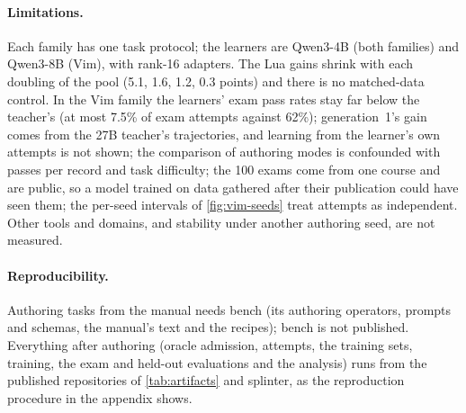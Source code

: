 \paragraph{Limitations.} Each family has one task protocol; the learners are Qwen3-4B (both families) and Qwen3-8B (Vim), with
rank-16 adapters. The Lua gains shrink with
each doubling of the pool (5.1, 1.6, 1.2, 0.3 points) and there is no matched-data control. In the Vim family the learners' exam
pass rates stay far below the teacher's (at most 7.5\% of exam attempts against 62\%); generation~1's gain comes from the 27B teacher's trajectories, and learning from the
learner's own attempts is not shown; the comparison of authoring modes is confounded with passes per record and task difficulty; the 100 exams come
from one course and are public, so a model trained on data gathered after their publication could have seen them; the per-seed intervals of \cref{fig:vim-seeds} treat attempts as independent. Other tools and domains, and
stability under another authoring seed, are not measured.

\paragraph{Reproducibility.} Authoring tasks from the manual needs bench (its authoring operators, prompts and schemas, the
manual's text and the recipes); bench is not published. Everything after authoring (oracle admission, attempts, the training
sets, training, the exam and held-out evaluations and the analysis) runs from the published repositories of \cref{tab:artifacts}
and splinter, as the reproduction procedure in the appendix shows.
